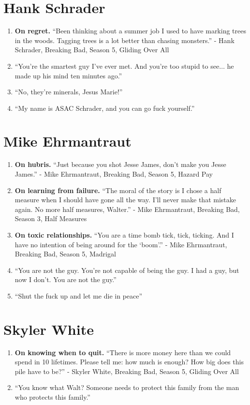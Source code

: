 \documentclass{book}
\numberwithin{equation}{section}
\begin{document}
\section{Hank Schrader}
\begin{enumerate}
    \item \textbf{On regret.} ``Been thinking about a summer job I used to have marking trees in the woods. Tagging trees is a lot better than chasing monsters.'' - Hank Schrader, Breaking Bad, Season 5, Gliding Over All
    \item ``You're the smartest guy I've ever met. And you're too stupid to see$\ldots$ he made up his mind ten minutes ago.''
    \item ``No, they're minerals, Jesus Marie!''
    \item ``My name is ASAC Schrader, and you can go fuck yourself.''
\end{enumerate}

\section{Mike Ehrmantraut}
\begin{enumerate}
    \item \textbf{On hubris.} ``Just because you shot Jesse James, don't make you Jesse James.'' - Mike Ehrmantraut, Breaking Bad, Season 5, Hazard Pay
    \item \textbf{On learning from failure.} ``The moral of the story is I chose a half measure when I should have gone all the way. I'll never make that mistake again. No more half measures, Walter.'' - Mike Ehrmantraut, Breaking Bad, Season 3, Half Measures
    \item \textbf{On toxic relationships.} ``You are a time bomb tick, tick, ticking. And I have no intention of being around for the `boom'.'' - Mike Ehrmantraut, Breaking Bad, Season 5, Madrigal
    \item ``You are not the guy. You're not capable of being the guy. I had a guy, but now I don't. You are not the guy.''
    \item ``Shut the fuck up and let me die in peace''
\end{enumerate}

\section{Skyler White}
\begin{enumerate}
    \item \textbf{On knowing when to quit.} ``There is more money here than we could spend in 10 lifetimes. Please tell me: how much is enough? How big does this pile have to be?'' - Skyler White, Breaking Bad, Season 5, Gliding Over All
    \item ``You know what Walt? Someone needs to protect this family from the man who protects this family.''
\end{enumerate}
\end{document}

